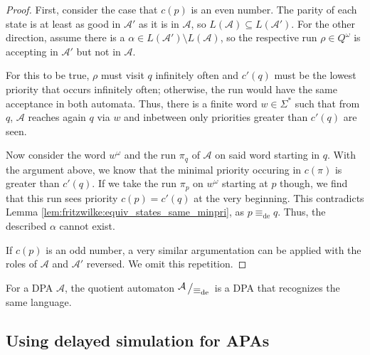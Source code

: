 \begin{proof}
	First, consider the case that $c(p)$ is an even number. The parity of each state is at least as good in $\mathcal{A}'$ as it is in $\mathcal{A}$, so $L(\mathcal{A}) \subseteq L(\mathcal{A}')$. For the other direction, assume there is a $\alpha \in L(\mathcal{A}') \setminus L(\mathcal{A})$, so the respective run $\rho \in Q^\omega$ is accepting in $\mathcal{A}'$ but not in $\mathcal{A}$. 
	
	For this to be true, $\rho$ must visit $q$ infinitely often and $c'(q)$ must be the lowest priority that occurs infinitely often; otherwise, the run would have the same acceptance in both automata. Thus, there is a finite word $w \in \Sigma^*$ such that from $q$, $\mathcal{A}$ reaches again $q$ via $w$ and inbetween only priorities greater than $c'(q)$ are seen.
	
	Now consider the word $w^\omega$ and the run $\pi_q$ of $\mathcal{A}$ on said word starting in $q$. With the argument above, we know that the minimal priority occuring in $c(\pi)$ is greater than $c'(q)$. If we take the run $\pi_p$ on $w^\omega$ starting at $p$ though, we find that this run sees priority $c(p) = c'(q)$ at the very beginning. This contradicts Lemma \ref{lem:fritzwilke:equiv_states_same_minpri}, as $p \equiv_\text{de} q$. Thus, the described $\alpha$ cannot exist. 
	
	If $c(p)$ is an odd number, a very similar argumentation can be applied with the roles of $\mathcal{A}$ and $\mathcal{A}'$ reversed. We omit this repetition.
\end{proof}

\begin{cor}
	For a DPA $\mathcal{A}$, the quotient automaton $\bigslant{\mathcal{A}}{\equiv_\text{de}}$ is a DPA that recognizes the same language.
\end{cor}


\subsection{Using delayed simulation for APAs}









